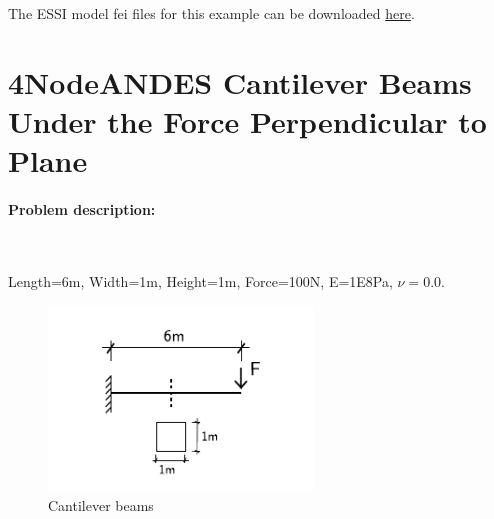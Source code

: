 The ESSI model fei files for this example can be downloaded 
\href{https://github.com/BorisJeremic/Real-ESSI-Examples/blob/master/model_fei_file/27NodeBrick_static/27NodeBrick_static.tgz?raw=true}{here}.
























\section{4NodeANDES Cantilever Beams Under the Force Perpendicular to Plane}

\paragraph{Problem description:} ~

Length=6m, Width=1m, Height=1m, Force=100N, E=1E8Pa, $\nu=0.0$. 

\begin{figure}[!htb]
  \centering
  \includegraphics[width=7cm]{./Figure-files/_Chapter_Appendix_Illustrative_Examples/cantilever_6.pdf}
  \caption{Cantilever beams}
  \label{fig Problem description for cantilever 4}
\end{figure}


